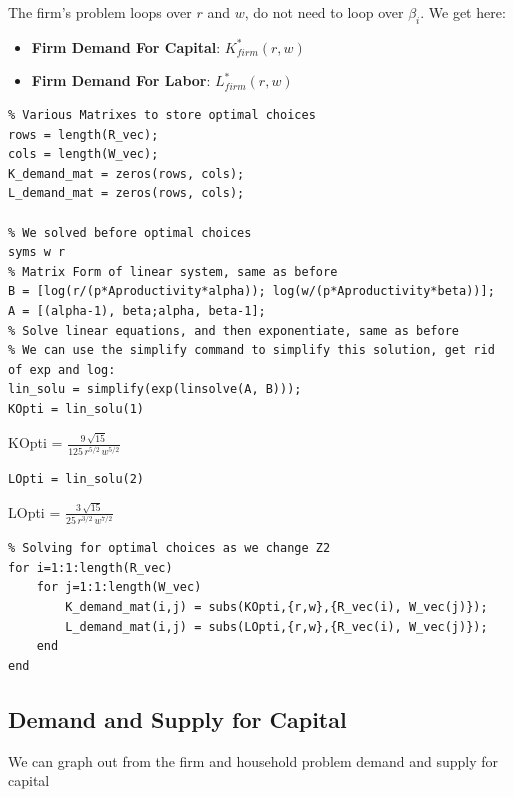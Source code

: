 \documentclass[
]{book}
\begin{document}
The firm's problem loops over \(r\) and \(w\), do not need to loop over
\(\beta_i\). We get here:

\begin{itemize}
\item
  \textbf{Firm Demand For Capital}: \(K_{firm}^* (r,w)\)
\item
  \textbf{Firm Demand For Labor}: \(L_{firm}^* (r,w)\)
\end{itemize}

\begin{verbatim}
% Various Matrixes to store optimal choices
rows = length(R_vec);
cols = length(W_vec);
K_demand_mat = zeros(rows, cols);
L_demand_mat = zeros(rows, cols);

% We solved before optimal choices
syms w r
% Matrix Form of linear system, same as before
B = [log(r/(p*Aproductivity*alpha)); log(w/(p*Aproductivity*beta))];
A = [(alpha-1), beta;alpha, beta-1];
% Solve linear equations, and then exponentiate, same as before
% We can use the simplify command to simplify this solution, get rid of exp and log:
lin_solu = simplify(exp(linsolve(A, B)));
KOpti = lin_solu(1)
\end{verbatim}

KOpti = \(\displaystyle \frac{9\,\sqrt{15}}{125\,r^{5/2} \,w^{5/2} }\)

\begin{verbatim}
LOpti = lin_solu(2)
\end{verbatim}

LOpti = \(\displaystyle \frac{3\,\sqrt{15}}{25\,r^{3/2} \,w^{7/2} }\)

\begin{verbatim}
% Solving for optimal choices as we change Z2
for i=1:1:length(R_vec)
    for j=1:1:length(W_vec)
        K_demand_mat(i,j) = subs(KOpti,{r,w},{R_vec(i), W_vec(j)});
        L_demand_mat(i,j) = subs(LOpti,{r,w},{R_vec(i), W_vec(j)});
    end
end
\end{verbatim}

\hypertarget{demand-and-supply-for-capital}{%
\subsection{Demand and Supply for Capital}\label{demand-and-supply-for-capital}}

We can graph out from the firm and household problem demand and supply
for capital
\end{document}
